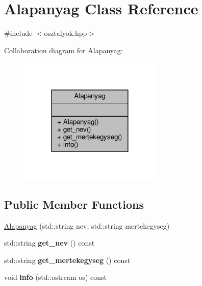 \hypertarget{class_alapanyag}{}\section{Alapanyag Class Reference}
\label{class_alapanyag}


{\ttfamily \#include $<$osztalyok.\+hpp$>$}



Collaboration diagram for Alapanyag\+:
\nopagebreak
\begin{figure}[H]
\begin{center}
\leavevmode
\includegraphics[width=192pt]{class_alapanyag__coll__graph}
\end{center}
\end{figure}
\subsection*{Public Member Functions}
\begin{DoxyCompactItemize}
\item 
\hyperlink{class_alapanyag_ac50b052225836ada3e16d4b1624d885b}{Alapanyag} (std\+::string nev, std\+::string mertekegyseg)
\item 
std\+::string {\bfseries get\+\_\+nev} () const \hypertarget{class_alapanyag_a77fde4a6af30c5fd1a95817b6c6804bb}{}\label{class_alapanyag_a77fde4a6af30c5fd1a95817b6c6804bb}

\item 
std\+::string {\bfseries get\+\_\+mertekegyseg} () const \hypertarget{class_alapanyag_ad55d9eb66d0c958d5c38c716776cb7be}{}\label{class_alapanyag_ad55d9eb66d0c958d5c38c716776cb7be}

\item 
void {\bfseries info} (std\+::ostream os) const \hypertarget{class_alapanyag_afb76b8324db797a066224f841d95bd47}{}\label{class_alapanyag_afb76b8324db797a066224f841d95bd47}

\end{DoxyCompactItemize}


